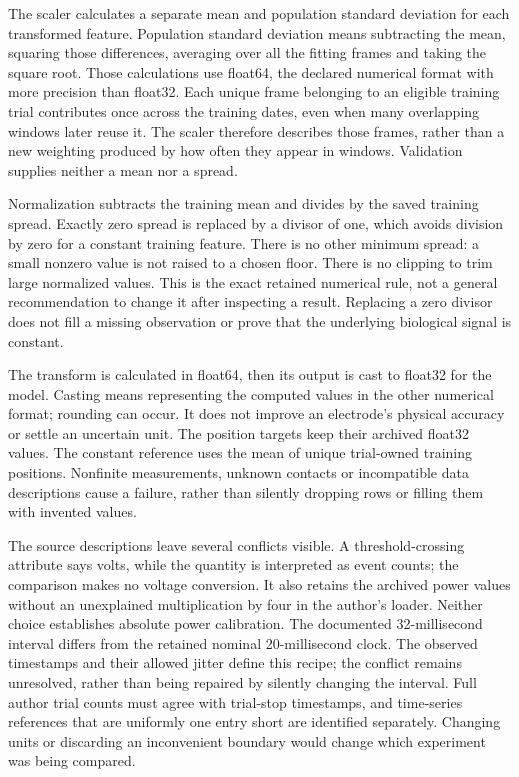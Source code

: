 The scaler calculates a separate mean and population standard deviation for
each transformed feature. Population standard deviation means subtracting the
mean, squaring those differences, averaging over all the fitting frames and
taking the square root. Those calculations use float64, the declared numerical
format with more precision than float32. Each unique frame belonging to an
eligible training trial contributes once across the training dates, even when
many overlapping windows later reuse it. The scaler therefore describes those
frames, rather than a new weighting produced by how often they appear in
windows. Validation supplies neither a mean nor a spread.

Normalization subtracts the training mean and divides by the saved training
spread. Exactly zero spread is replaced by a divisor of one, which avoids
division by zero for a constant training feature. There is no other minimum
spread: a small nonzero value is not raised to a chosen floor. There is no
clipping to trim large normalized values. This is the exact retained numerical
rule, not a general recommendation to change it after inspecting a result.
Replacing a zero divisor does not fill a missing observation or prove that
the underlying biological signal is constant.

The transform is calculated in float64, then its output is cast to float32
for the model. Casting means representing the computed values in the other
numerical format; rounding can occur. It does not improve an electrode's
physical accuracy or settle an uncertain unit. The position targets keep
their archived float32 values. The constant reference uses the mean of unique
trial-owned training positions. Nonfinite measurements, unknown contacts or
incompatible data descriptions cause a failure, rather than silently dropping
rows or filling them with invented values.

The source descriptions leave several conflicts visible. A threshold-crossing
attribute says volts, while the quantity is interpreted as event counts; the
comparison makes no voltage conversion. It also retains the archived power
values without an unexplained multiplication by four in the author's loader.
Neither choice establishes absolute power calibration. The documented
32-millisecond interval differs from the retained nominal 20-millisecond
clock. The observed timestamps and their allowed jitter define this recipe;
the conflict remains unresolved, rather than being repaired by silently
changing the interval. Full author trial counts must agree with trial-stop
timestamps, and time-series references that are uniformly one entry short
are identified separately. Changing units or discarding an inconvenient
boundary would change which experiment was being compared.


